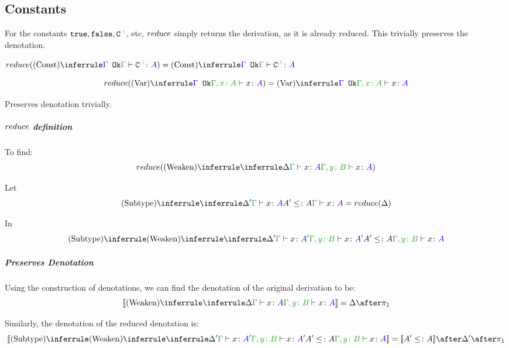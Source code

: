 \documentclass{report}
\begin{document}
    \subsection{Constants}
        For the constants $\t, \f, \const{A}$, etc, $reduce$ simply returns the derivation, as it is already reduced. This trivially preserves the denotation.

        $\reduce(\truleconst) = \truleconst$

        \begin{equation}
            \reduce(\ntreeruleI{Var}{\ok{\G}}{\typerelation{\gax}{x}{A}}) =  \ntreeruleI{Var}{\ok{\G}}{\typerelation{\gax}{x}{A}}
        \end{equation}

        Preserves denotation trivially.

        \subparagraph{$reduce$ definition}
        To find:
        \begin{equation}
            \reduce(\ntreeruleI{Weaken}{\treeruleI{\D}{\gtyperelation{x}{A}}}{\typerelation{\gby}{x}{A}})
        \end{equation}

        Let 
        \begin{equation}\label{WeakenDeltaReduction}
            \ntreeruleII{Subtype}{\treeruleI{\D'}{\gtyperelation{x}{A}}}{ A'\subtype A}{\gtyperelation{x}{A}} = \reduce(\D)
        \end{equation}

        In 
        \begin{equation}
            \ntreeruleII{Subtype}{
            \ntreeruleI{Weaken}{
                \treeruleI{\D'}{\gtyperelation{x}{A'}}
            } {
                \typerelation{\gby}{x}{A'}
            }
            }{
            A' \subtype A
            }{\typerelation{\gby}{x}{A}}
        \end{equation}

        \subparagraph{Preserves Denotation}
        Using the construction of denotations, we can find the denotation of the original derivation to be:
        \begin{equation}
            \deno{\ntreeruleI{Weaken}{\treeruleI{\D}{\gtyperelation{x}{A}}}{\typerelation{\gby}{x}{A}}} = \D \after \p
        \end{equation}

        Similarly, the denotation of the reduced denotation is:
        \begin{equation}
            \deno{\ntreeruleII{Subtype}{
                \ntreeruleI{Weaken}{
                    \treeruleI{\D'}{\gtyperelation{x}{A'}}
                } {
                    \typerelation{\gby}{x}{A'}
                }
                }{
                A' \subtype A
                }{\typerelation{\gby}{x}{A}}} = \deno{A'\subtype A}\after \D' \after \p
        \end{equation}
\end{document}
